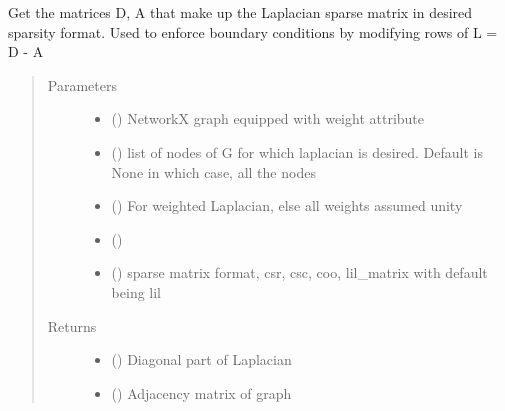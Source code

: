 \documentclass[letterpaper,10pt,english]{sphinxmanual}
\begin{document}
\begin{fulllineitems}
\label{\detokenize{pydfnworks:pydfnworks.dfnGraph.graph_flow.get_laplacian_sparse_mat}}
Get the matrices D, A that make up the Laplacian sparse matrix in desired sparsity format. Used to enforce boundary conditions by modifying rows of L = D - A
\begin{quote}\begin{description}
\item[{Parameters}] \leavevmode\begin{itemize}
\item {} 
 () \textendash{} NetworkX graph equipped with weight attribute

\item {} 
 () \textendash{} list of nodes of G for which laplacian is desired. Default is None in which case, all the nodes

\item {} 
 () \textendash{} For weighted Laplacian, else all weights assumed unity

\item {} 
 (\sphinxstyleliteralemphasis{\sphinxupquote{, }}) \textendash{} 

\item {} 
 () \textendash{} sparse matrix format, csr, csc, coo, lil\_matrix with default being lil

\end{itemize}

\item[{Returns}] \leavevmode
\begin{itemize}
\item {} 
 () \textendash{} Diagonal part of Laplacian

\item {} 
 () \textendash{} Adjacency matrix of graph

\end{itemize}


\end{description}\end{quote}

\end{fulllineitems}
\end{document}
